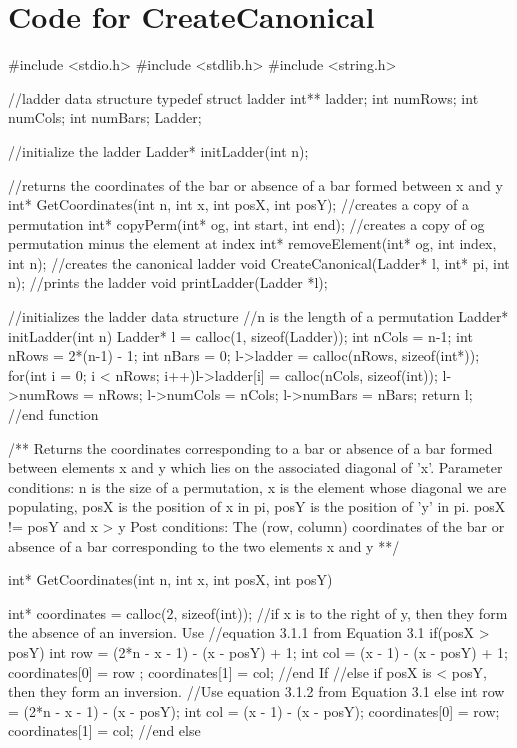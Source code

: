 \section{Code for {\sc CreateCanonical}}
\begin{singlespace}
\begin{footnotesize}
\begin{code}

#include <stdio.h>
#include <stdlib.h>
#include <string.h>


//ladder data structure
typedef struct ladder
{
    int** ladder;
    int numRows;
    int numCols;
    int numBars;
} Ladder;

//initialize the ladder 
Ladder* initLadder(int n);

//returns the coordinates of the bar or absence of a bar formed between x and y
int* GetCoordinates(int n, int x, int posX, int posY);
//creates a copy of a permutation
int* copyPerm(int* og, int start, int end);
//creates a copy of og permutation minus the element at index
int* removeElement(int* og, int index, int n);
//creates the canonical ladder
void CreateCanonical(Ladder* l, int* pi, int n);
//prints the ladder
void printLadder(Ladder *l);


//initializes the ladder data structure
//n is the length of a permutation
Ladder* initLadder(int n)
{
	Ladder* l = calloc(1, sizeof(Ladder));
	int nCols = n-1;
	int nRows = 2*(n-1) - 1;
	int nBars = 0;
	l->ladder = calloc(nRows, sizeof(int*));
	for(int i = 0; i < nRows; i++)l->ladder[i] = calloc(nCols, sizeof(int));
	l->numRows = nRows;
	l->numCols = nCols;
	l->numBars = nBars;
	return l;
}//end function

/**
	Returns the coordinates corresponding to a bar or absence of a bar 
	formed between elements x and y which lies on the associated diagonal of 'x'. 
	Parameter conditions: n is the size of a permutation, x is the element whose 
	diagonal we are populating, posX is the position of x in pi, posY is the 
	position of 'y' in pi. posX != posY and x > y
        Post conditions: The (row, column) coordinates of the bar 
	or absence of a bar corresponding to the two elements x and y
**/ 

int* GetCoordinates(int n, int x, int posX, int posY){
	
	int* coordinates = calloc(2, sizeof(int));
	//if x is to the right of y, then they form the absence of an inversion. Use 
	//equation 3.1.1 from Equation 3.1
	if(posX > posY){
		int row = (2*n - x - 1) - (x - posY) + 1;
		int col = (x - 1) - (x - posY) + 1;
		coordinates[0] = row ;
		coordinates[1] = col;
	}//end If
	//else if posX is < posY, then they form an inversion. 
	//Use equation 3.1.2 from Equation 3.1
	else{
		int row = (2*n - x - 1) - (x - posY);
		int col = (x - 1) - (x - posY);
		coordinates[0] = row;
		coordinates[1] = col;
	}//end else 

}
\end{code}
\end{footnotesize}
\end{singlespace}
